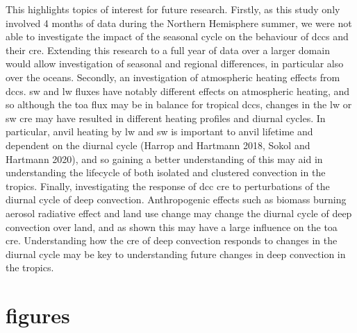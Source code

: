 This highlights topics of interest for future research. Firstly, as this
study only involved 4 months of data during the Northern Hemisphere
summer, we were not able to investigate the impact of the seasonal cycle
on the behaviour of \acrshort{dcc}s and their \acrshort{cre}. Extending this research to a
full year of data over a larger domain would allow investigation of
seasonal and regional differences, in particular also over the oceans.
Secondly, an investigation of atmospheric heating effects from \acrshort{dcc}s. \acrshort{sw}
and \acrshort{lw} fluxes have notably different effects on atmospheric heating, and
so although the \acrshort{toa} flux may be in balance for tropical
\acrshort{dcc}s, changes in the \acrshort{lw} or \acrshort{sw} \acrshort{cre} may have resulted in different heating
profiles and diurnal cycles. In particular, anvil heating by \acrshort{lw} and \acrshort{sw}
is important to anvil lifetime and dependent on the diurnal cycle
(Harrop and Hartmann 2018, Sokol and Hartmann 2020), and so gaining a
better understanding of this may aid in understanding the lifecycle of
both isolated and clustered convection in the tropics. Finally,
investigating the response of \acrshort{dcc} \acrshort{cre} to perturbations of the diurnal
cycle of deep convection. Anthropogenic effects such as biomass burning
aerosol radiative effect and land use change may change the diurnal
cycle of deep convection over land, and as shown this may have a large
influence on the \acrshort{toa} \acrshort{cre}. Understanding how the \acrshort{cre} of deep convection
responds to changes in the diurnal cycle may be key to understanding
future changes in deep convection in the tropics.


\section{figures}

